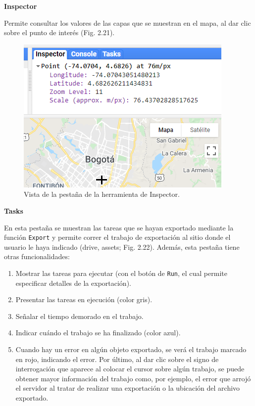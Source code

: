\documentclass[
  12pt,
  letterpaper,
  twoside]{book}
\providecommand{\tightlist}{%
  \setlength{\itemsep}{0pt}\setlength{\parskip}{0pt}}
\begin{document}
\textbf{Inspector}

Permite consultar los valores de las capas que se muestran en el mapa, al dar clic sobre el punto de interés (Fig. 2.21).

\begin{figure}[btp]

{\centering \includegraphics[width=0.8\linewidth]{Img/inspector} 

}

\caption{Vista de la pestaña de la herramienta de Inspector.}\label{fig:unnamed-chunk-22}
\end{figure}

\textbf{Tasks}

En esta pestaña se muestran las tareas que se hayan exportado mediante la función \texttt{Export} y permite correr el trabajo de exportación al sitio donde el usuario le haya indicado (drive, assets; Fig. 2.22). Además, esta pestaña tiene otras funcionalidades:

\begin{enumerate}
\def\labelenumi{\arabic{enumi}.}
\tightlist
\item
  Mostrar las tareas para ejecutar (con el botón de \texttt{Run}, el cual permite especificar detalles de la exportación).
\item
  Presentar las tareas en ejecución (color gris).
\item
  Señalar el tiempo demorado en el trabajo.
\item
  Indicar cuándo el trabajo se ha finalizado (color azul).
\item
  Cuando hay un error en algún objeto exportado, se verá el trabajo marcado en rojo, indicando el error. Por último, al dar clic sobre el signo de interrogación que aparece al colocar el cursor sobre algún trabajo, se puede obtener mayor información del trabajo como, por ejemplo, el error que arrojó el servidor al tratar de realizar una exportación o la ubicación del archivo exportado.
\end{enumerate}
\end{document}
